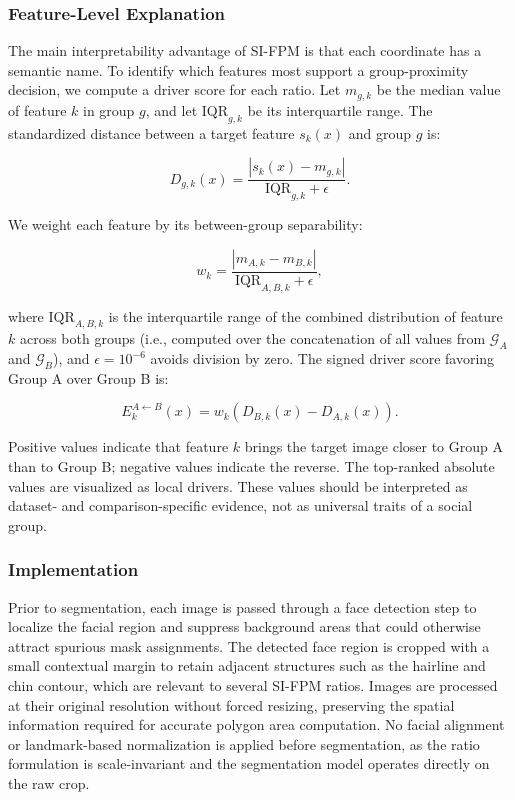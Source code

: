 \documentclass{article}
\begin{document}
\subsubsection{Feature-Level Explanation}
\label{explainability}

The main interpretability advantage of SI-FPM is that each coordinate has a semantic name. To identify which features most support a group-proximity decision, we compute a driver score for each ratio. Let $m_{g,k}$ be the median value of feature $k$ in group $g$, and let $\text{IQR}_{g,k}$ be its interquartile range. The standardized distance between a target feature $s_k(x)$ and group $g$ is:

\[
D_{g,k}(x)=\frac{|s_k(x)-m_{g,k}|}{\text{IQR}_{g,k}+\epsilon}.
\]

We weight each feature by its between-group separability:

\[
w_k=\frac{|m_{A,k}-m_{B,k}|}{\text{IQR}_{A,B,k}+\epsilon},
\]

where $\text{IQR}_{A,B,k}$ is the interquartile range of the combined distribution of feature $k$ across both groups (i.e., computed over the concatenation of all values from $\mathcal{G}_A$ and $\mathcal{G}_B$), and $\epsilon = 10^{-6}$ avoids division by zero. The signed driver score favoring Group A over Group B is:

\[
E_k^{A\leftarrow B}(x)=w_k\left(D_{B,k}(x)-D_{A,k}(x)\right).
\]

Positive values indicate that feature $k$ brings the target image closer to Group A than to Group B; negative values indicate the reverse. The top-ranked absolute values are visualized as local drivers. These values should be interpreted as dataset- and comparison-specific evidence, not as universal traits of a social group.


\subsubsection{Implementation}
\label{code}

Prior to segmentation, each image is passed through a face detection step to localize the facial region and suppress background areas that could otherwise attract spurious mask assignments. The detected face region is cropped with a small contextual margin to retain adjacent structures such as the hairline and chin contour, which are relevant to several SI-FPM ratios. Images are processed at their original resolution without forced resizing, preserving the spatial information required for accurate polygon area computation. No facial alignment or landmark-based normalization is applied before segmentation, as the ratio formulation is scale-invariant and the segmentation model operates directly on the raw crop.
\end{document}
